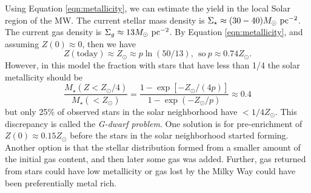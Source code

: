 \documentclass[]{article}
\begin{document}
Using Equation \ref{eqn:metallicity}, we can estimate the yield in the
local Solar region of the MW.  The current stellar mass density is $\Sigma_\star\approx(30-40)M_{\odot}~\mathrm{pc}^{-2}$.
The current gas density is $\Sigma_g \approx 13M_{\odot}~\mathrm{pc}^{-2}$.  By Equation \ref{eqn:metallicity}, and
assuming $Z(0) \approx 0$, then we have
\begin{equation}
Z(\mathrm{today}) \approx Z_{\odot} \approx p \ln (50/13),~~\mathrm{so}~p\approx0.74Z_{\odot}.
\end{equation}
\noindent
However, in this model
the fraction with stars that have less than 1/4 the solar metallicity should be
\begin{equation}
\frac{M_\star(Z<Z_{\odot}/4)}{M_\star(<Z_\odot)} = \frac{1 - \exp[-Z_\odot/(4p)]}{1-\exp(-Z_\odot/p)}\approx 0.4
\end{equation}
\noindent
but only 25\% of observed stars in the solar neighborhood have $<1/4Z_{\odot}$.  This discrepancy
is called the {\it G-dwarf problem}. One solution is for pre-enrichment of $Z(0)\approx0.15Z_{\odot}$
before the stars in the solar neighborhood started forming.  Another option is that
the stellar distribution formed from a smaller amount of the initial gas content, and then later
some gas was added.  Further, gas returned from stars could have low metallicity or gas
lost by the Milky Way could have been preferentially metal rich.
\end{document}

